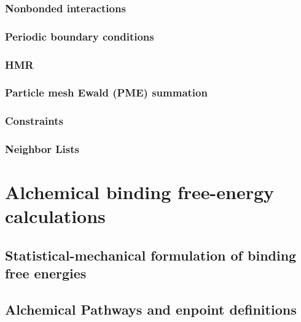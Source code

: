 \lipsum[1][1-3]

\subsubsection{Nonbonded interactions}
\lipsum[1][1-3]

\subsubsection{Periodic boundary conditions}

\lipsum[1][1-3]

\subsubsection{HMR}

\lipsum[1][1-3]

\subsubsection{Particle mesh Ewald (PME) summation}

\lipsum[1][1-3]

\subsubsection{Constraints}

\lipsum[1][1-3]

\subsubsection{Neighbor Lists}

\lipsum[1][1-3]

\section{Alchemical binding free-energy calculations}

\lipsum[1][1-3]

\subsection{Statistical-mechanical formulation of binding free energies}
\lipsum[1][1-3]

\subsection{Alchemical Pathways and enpoint definitions}

